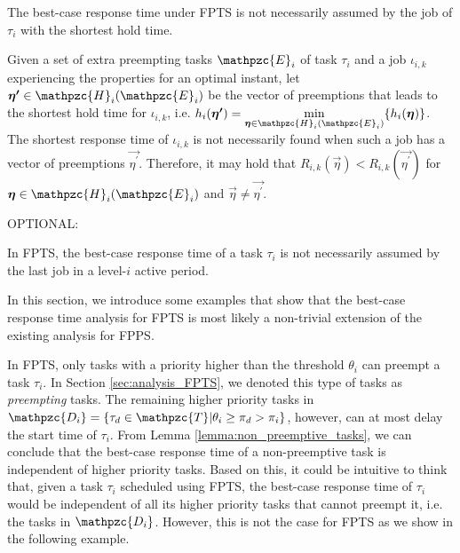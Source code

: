 \begin{fact} \label{cor:shortest_hold_time}The best-case response time under FPTS is not necessarily assumed by the job of $\tau_i$ with the shortest hold time.
\end{fact}


\begin{fact}\label{fct:active_period}
	Given a set of extra preempting tasks $\mathpzc{E}_i$ of task $\tau_i$ and a job $\iota_{i,k}$ experiencing the properties for an optimal instant, let $\vec{\eta^{\prime}} \in \mathpzc{H}_i(\mathpzc{E}_i)$ be the vector of preemptions that leads to the shortest hold time for $\iota_{i,k}$, i.e. $h_i(\vec{\eta^{\prime}}) = \min\limits_{\vec{\eta} \in \mathpzc{H}_i(\mathpzc{E}_i)}\{h_i(\vec{\eta})\}$. The shortest response time of $\iota_{i,k}$ is not necessarily found when such a job has a vector of preemptions $\vec{\eta^{\prime}}$. Therefore, it may hold that $R_{i,k}(\vec{\eta})<R_{i,k}(\vec{\eta^{\prime}})$ for $\vec{\eta} \in \mathpzc{H}_i(\mathpzc{E}_i)$ and $\vec{\eta} \neq \vec{\eta^{\prime}}$.
\end{fact}


OPTIONAL:
\begin{fact}\label{fct:active_period}
	In FPTS, the best-case response time of a task $\tau_i$ is not necessarily assumed by the last job in a level-$i$ active period.
\end{fact}

\iffalse
In this section, we introduce some examples that show that the best-case response time analysis for FPTS is most likely a non-trivial extension of the existing analysis for FPPS.

In FPTS, only tasks with a priority higher than the threshold $\theta_i$ can preempt a task $\tau_i$. In Section \ref{sec:analysis_FPTS}, we denoted this type of tasks as \textit{preempting} tasks. The remaining higher priority tasks in $\mathpzc{D_i}=\{\tau_d \in \mathpzc{T}|\theta_i \geq \pi_d > \pi_i\}$, however, can at most delay the start time of $\tau_i$. From Lemma \ref{lemma:non_preemptive_tasks}, we can conclude that the best-case response time of a non-preemptive task  is independent of higher priority tasks. Based on this, it could be intuitive to think that, given a task $\tau_i$ scheduled using FPTS, the best-case response time of $\tau_i$ would be independent of all its higher priority tasks that cannot preempt it, i.e. the tasks in $\mathpzc{D_i}$. However, this is not the case for FPTS as we show in the following example.

